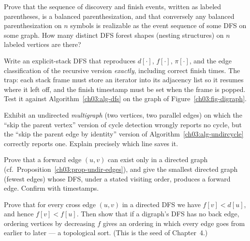 \begin{exercise}\label{ch03:ex-paren}
Prove that the sequence of discovery and finish events, written as labeled parentheses, is a balanced parenthesization, and that conversely any balanced parenthesization on $n$ symbols is realizable as the event sequence of some DFS on some graph. How many distinct DFS forest shapes (nesting structures) on $n$ labeled vertices are there?
\end{exercise}

\begin{exercise}\label{ch03:ex-iterative}
Write an explicit-stack DFS that reproduces $d[\cdot]$, $f[\cdot]$, $\pi[\cdot]$, and the edge classification of the recursive version \emph{exactly}, including correct finish times. The trap: each stack frame must store an iterator into its adjacency list so it resumes where it left off, and the finish timestamp must be set when the frame is popped. Test it against Algorithm~\ref{ch03:alg-dfs} on the graph of Figure~\ref{ch03:fig-digraph}.
\end{exercise}

\begin{exercise}\label{ch03:ex-break}
Exhibit an undirected \emph{multigraph} (two vertices, two parallel edges) on which the ``skip the parent vertex'' version of cycle detection wrongly reports no cycle, but the ``skip the parent edge by identity'' version of Algorithm~\ref{ch03:alg-undircycle} correctly reports one. Explain precisely which line saves it.
\end{exercise}

\begin{exercise}\label{ch03:ex-fwd}
Prove that a forward edge $(u,v)$ can exist only in a directed graph (cf.\ Proposition~\ref{ch03:prop-undir-edges}), and give the smallest directed graph (fewest edges) whose DFS, under a stated visiting order, produces a forward edge. Confirm with timestamps.
\end{exercise}

\begin{exercise}\label{ch03:ex-cross}
Prove that for every cross edge $(u,v)$ in a directed DFS we have $f[v]<d[u]$, and hence $f[v]<f[u]$. Then show that if a digraph's DFS has no back edge, ordering vertices by decreasing $f$ gives an ordering in which every edge goes from earlier to later --- a topological sort. (This is the seed of Chapter~4.)
\end{exercise}

